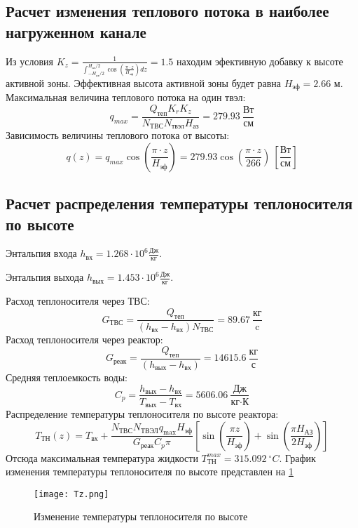 \subsection{Расчет изменения теплового потока в наиболее нагруженном канале}
Из условия $K_z = \frac 1 {\int_{-H_{\text{аз}}/2}^{H_{\text{аз}}/2} \cos \left( \frac {\pi \cdot z} {H_{\text{эф}}}\right)dz} = 1.5$ находим эфективную добавку к высоте активной зоны. Эффективная высота активной зоны будет равна $H_{\text{эф}} = 2.66$ м. Максимальная величина теплового потока на один твэл:
$$
q_{max} = \frac {Q_{\text{теп}}K_r K_z}{N_{ТВС}N_{\text{твэл}}H_{\text{аз}}} = 279.93\  \frac {\text{Вт}} {\text{см}}
$$ 
Зависимость величины теплового потока от высоты:
$$
q(z) = q_{max}\cos\left(\frac {\pi\cdot z} {H_{\text{эф}}}\right) = 279.93 \cos \left(\frac {\pi \cdot z} {266} \right)\ \left[\frac{\text{Вт}}{\text{см}} \right]
$$

\subsection{Расчет распределения температуры теплоносителя по высоте}

Энтальпия входа $h_{\text{вх}} =1.268 \cdot 10^6 \frac{Дж}{кг}$.%

\noindent Энтальпия выхода $h_{\text{вых}} =1.453 \cdot 10^6 \frac{Дж}{кг}$. %

\noindent Расход теплоносителя через ТВС:
$$
G_{ТВС} = \frac {Q_{\text{теп}}} {(h_{\text{вх}} - h_{\text{вх}})N_{\text{ТВС}}} = 89.67 \ \frac {\text{кг}}{\text{c}} 
$$
Расход теплоносителя через реактор:
$$
G_{\text{реак}} = \frac {Q_{\text{теп}}} {\left(h_{\text{вых}} - h_{\text{вх}}\right)} = 14615.6\ \frac{\text{кг}} {\text{с}}
$$
Средняя теплоемкость воды:
$$
C_p = \frac {h_{\text{вых}} - h_{\text{вх}}} {T_{\text{вых}} - T_{\text{вх}}} = 5606.06\ \frac{\text{Дж}} {\text{кг} \cdot \text{К}}
$$
\noindent Распределение температуры теплоносителя по высоте реактора:
$$
T_{ТН}(z) = T_{\text{вх}} + \frac {N_{\text{ТВС}}N_{\text{ТВЭЛ}}q_{\max}H_{\text{эф}}} {G_{\text{реак}}C_p\pi}\left[\sin \left(\frac {\pi z}{H_{\text{эф}}} \right) +\sin \left(\frac {\pi H_{\text{АЗ}}} {2H_{\text{эф}}} \right) \right]
$$
\noindent Отсюда максимальная температура жидкости $T_{\text{ТН}}^{max} = 315.092\  ^\circ C$.
График изменения температуры теплоносителя по высоте представлен на \ref{pic:TZ}

\begin{figure}[H]
	\begin{center}
		\texttt{[image: Tz.png]}
		\caption{Изменение температуры теплоносителя по высоте}
		\label{pic:TZ} %
	\end{center}
\end{figure}

